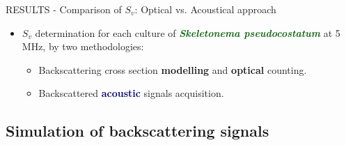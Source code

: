\documentclass[handout]{beamer}
\newcommand\Fontable{\fontsize{9}{10}\selectfont}
\begin{document}
\begin{frame}{RESULTS - Comparison of $S_v$: Optical vs. Acoustical approach}
\Fontable
\begin{itemize}
\item<2-> $S_v$ determination for each culture of \textcolor{darkgreen}{\bf \textit{Skeletonema pseudocostatum}} at 5 MHz, by two methodologies:
\begin{itemize}
\Fontable
\item<3-> Backscattering cross section \textbf{modelling} and \textbf{optical} counting.
\item<4-> Backscattered \textcolor{darkblue}{\bf acoustic} signals acquisition.
\end{itemize}
\end{itemize}

\centering
{}

\end{frame}

\subsection{Simulation of backscattering signals}
\end{document}
